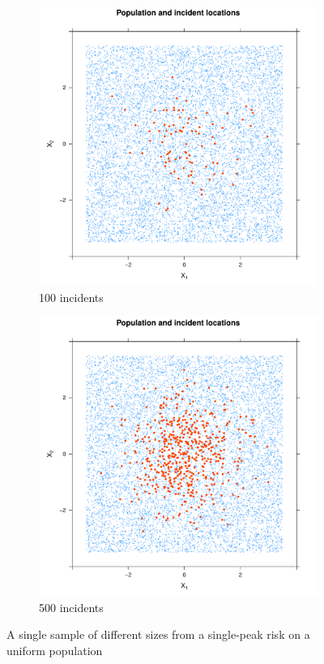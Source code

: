 \begin{figure}[htbp]
    \centering
    \begin{subfigure}{0.45\textwidth}
    \includegraphics[width=\textwidth]{results/unif_100_1_1h/output/population_and_incidents_scatter}
    \caption{100 incidents}
    \end{subfigure}
    \begin{subfigure}{0.45\textwidth}
    \includegraphics[width=\textwidth]{results/unif_500_1_1h/output/population_and_incidents_scatter}
    \caption{500 incidents}
    \end{subfigure}
    \caption{A single sample of different sizes from a single-peak risk on a uniform population}
    \label{fig:one_sample:unif_NCases_1h}
\end{figure}


